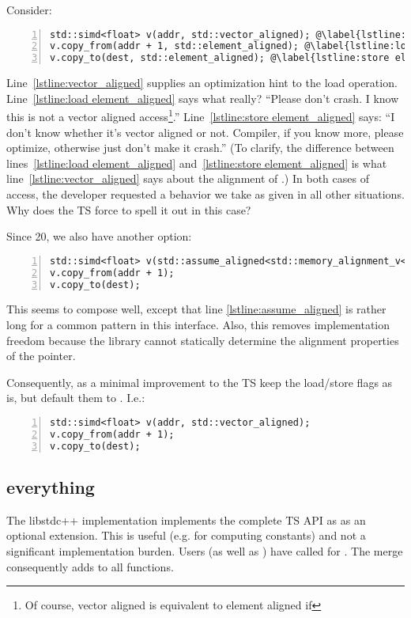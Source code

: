 Consider:
\medskip\begin{lstlisting}[style=Vc,numbers=left]
std::simd<float> v(addr, std::vector_aligned); @\label{lstline:vector_aligned}@
v.copy_from(addr + 1, std::element_aligned); @\label{lstline:load element_aligned}@
v.copy_to(dest, std::element_aligned); @\label{lstline:store element_aligned}@
\end{lstlisting}
Line~\ref{lstline:vector_aligned} supplies an optimization hint to the load operation.
Line~\ref{lstline:load element_aligned} says what really?
“Please don't crash.
I know this is not a vector aligned access\footnote{Of course, vector aligned is equivalent to element aligned if }.”
Line~\ref{lstline:store element_aligned} says:
“I don't know whether it's vector aligned or not.
Compiler, if you know more, please optimize, otherwise just don't make it crash.”
(To clarify, the difference between lines~\ref{lstline:load element_aligned} and~\ref{lstline:store element_aligned} is what line~\ref{lstline:vector_aligned} says about the alignment of .)
In both cases of  access, the developer requested a behavior we take as given in all other situations.
Why does the TS force to spell it out in this case?

Since \CC{}20, we also have another option:
\medskip\begin{lstlisting}[numbers=left]
std::simd<float> v(std::assume_aligned<std::memory_alignment_v<std::simd<float>>>(addr)); @\label{lstline:assume_aligned}@
v.copy_from(addr + 1);
v.copy_to(dest);
\end{lstlisting}
This seems to compose well, except that line \ref{lstline:assume_aligned} is rather long for a common pattern in this interface.
Also, this removes implementation freedom because the library cannot statically determine the alignment properties of the pointer.

Consequently, as a minimal improvement to the TS keep the load/store flags as
is, but default them to .
I.e.:
\medskip\begin{lstlisting}[numbers=left]
std::simd<float> v(addr, std::vector_aligned);
v.copy_from(addr + 1);
v.copy_to(dest);
\end{lstlisting}

\subsection{ everything}
The libstdc++ implementation implements the complete TS API as  as an optional extension.
This is useful (e.g. for computing constants) and not a significant implementation burden.
Users (as well as \textcite{P2638R0}) have called for .
The merge consequently adds  to all functions.

